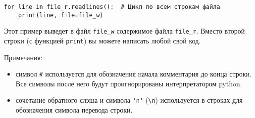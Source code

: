 \documentclass[a4paper, 12pt]{article}
\begin{document}
\begin{lstlisting}[texcl]
for line in file_r.readlines():  # Цикл по всем строкам файла
    print(line, file=file_w)
\end{lstlisting}

Этот пример выведет в файл \lstinline{file_w} содержимое файла \lstinline{file_r}. Вместо второй строки (с функцией \lstinline{print}) вы можете написать любой свой код.
\vfill

\hrulefill

{\footnotesize Примечания:
\begin{itemize}
\item символ \lstinline{#} используется для обозначения начала комментария до конца строки. Все символы после него будут проигнорированы интерпретатором python.
\item сочетание обратного слэша и символа \lstinline{'n'} (\lstinline{\n}) используется в строках для обозначения символа перевода строки.
\end{itemize}
}
\end{document}
